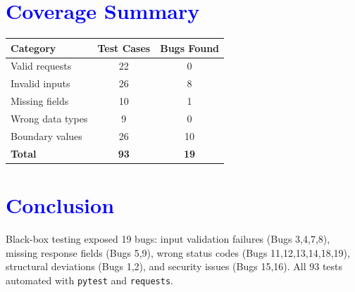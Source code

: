 \documentclass{article}
\begin{document}
\section*{\textcolor{blue}{Coverage Summary}}

\begin{center}
\begin{tabular}{lcc}
\toprule
Category & Test Cases & Bugs Found \\
\midrule
Valid requests & 22 & 0 \\
Invalid inputs & 26 & 8 \\
Missing fields & 10 & 1 \\
Wrong data types & 9 & 0 \\
Boundary values & 26 & 10 \\
\midrule
\textbf{Total} & \textbf{93} & \textbf{19} \\
\bottomrule
\end{tabular}
\end{center}

\section*{\textcolor{blue}{Conclusion}}
Black-box testing exposed 19 bugs: input validation failures (Bugs 3,4,7,8), missing response fields (Bugs 5,9), wrong status codes (Bugs 11,12,13,14,18,19), structural deviations (Bugs 1,2), and security issues (Bugs 15,16). All 93 tests automated with \texttt{pytest} and \texttt{requests}.
\end{document}
